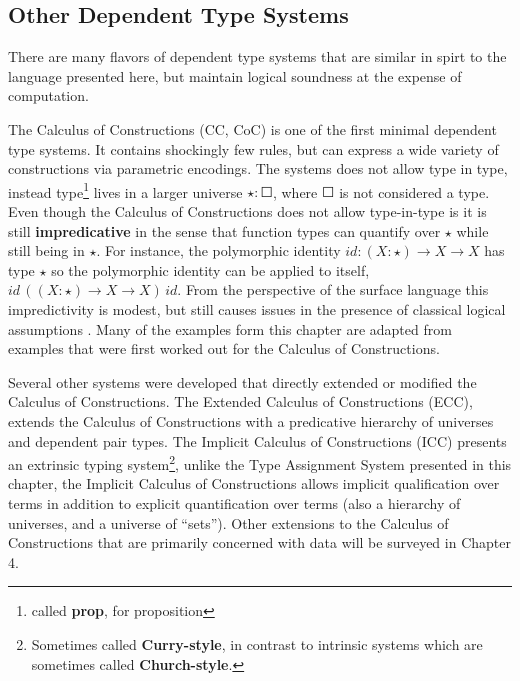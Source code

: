 
\subsection{Other Dependent Type Systems}

There are many flavors of dependent type systems that are similar
in spirt to the language presented here, but maintain logical soundness
at the expense of computation. 

The Calculus of Constructions (CC, CoC)\cite{10.1016/0890-5401(88)90005-3}
is one of the first minimal dependent type systems. It contains shockingly
few rules, but can express a wide variety of constructions via parametric
encodings. The systems does not allow type in type, instead type\footnote{called \textbf{prop}, for proposition}
lives in a larger universe $\star:\Square$, where $\Square$ is not
considered a type. Even though the Calculus of Constructions does
not allow type-in-type is it is still \textbf{impredicative }in the
sense that function types can quantify over $\star$ while still being
in $\star$. For instance, the polymorphic identity $id:(X:\star)\rightarrow X\rightarrow X$
has type $\star$ so the polymorphic identity can be applied to itself,
$id\,\left((X:\star)\rightarrow X\rightarrow X\right)\,id$. From
the perspective of the surface language this impredictivity is modest,
but still causes issues in the presence of classical logical assumptions
. Many of the examples form this chapter are adapted from
examples that were first worked out for the Calculus of Constructions.

Several other systems were developed that directly extended or modified
the Calculus of Constructions. The Extended Calculus of Constructions
(ECC)\cite{luo1990extended,luo1994computation}, extends the Calculus
of Constructions with a predicative hierarchy of universes and dependent
pair types. The Implicit Calculus of Constructions (ICC)\cite{10.1007/3-540-45413-6_27,10.1007/978-3-540-78499-9_26}
presents an extrinsic typing system\footnote{Sometimes called \textbf{Curry-style}, in contrast to intrinsic systems
which are sometimes called \textbf{Church-style}.}, unlike the Type Assignment System presented in this chapter, the
Implicit Calculus of Constructions allows implicit qualification over
terms in addition to explicit quantification over terms (also a hierarchy
of universes, and a universe of ``sets''). Other extensions to the
Calculus of Constructions that are primarily concerned with data will
be surveyed in Chapter 4.

